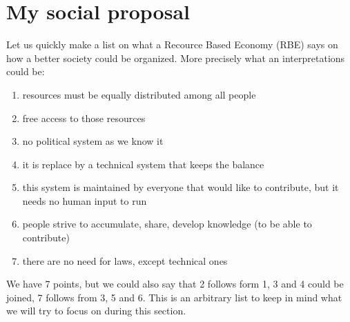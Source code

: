 \documentclass{article}
\begin{document}
\section{My social proposal}
\label{sec:social}
Let us quickly make a list on what a Recource Based Economy (RBE)\cite{rbe} says on how a better society could be organized.
More precisely what an interpretations could be:
\begin{enumerate}
\item resources must be equally distributed among all people
\item free access to those resources
\item no political system as we know it
\item it is replace by a technical system that keeps the balance
\item this system is maintained by everyone that would like to contribute, but it needs no human input to run
\item people strive to accumulate, share, develop knowledge (to be able to contribute)
\item there are no need for laws, except technical ones
\end{enumerate}
We have 7 points, but we could also say that 2 follows form 1, 3 and 4 could be joined, 7 follows from 3, 5 and 6.
This is an arbitrary list to keep in mind what we will try to focus on during this section.
\end{document}
